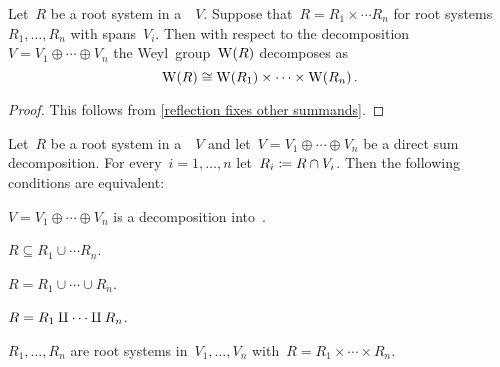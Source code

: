 \begin{lemma}
  \label{decomposition of weyl group}
  Let~$R$ be a root system in a~{\vectorspace{$\kf$}}~$V$.
  Suppose that~$R = R_1 \times \dotsb R_n$ for root systems~$R_1, \dotsc, R_n$ with spans~$V_i$.
  Then with respect to the decomposition~$V = V_1 \oplus \dotsb \oplus V_n$ the Weyl~group~$\operatorname{W}(R)$ decomposes as
  \[
    \operatorname{W}(R)
    \cong
    \operatorname{W}(R_1) \times \dotsb \times \operatorname{W}(R_n) \,.
  \]
\end{lemma}


\begin{proof}
  This follows from \cref{reflection fixes other summands}.
\end{proof}


\begin{lemma}
  \label{characterizations of root system decompositions}
  Let~$R$ be a root system in a~{\vectorspace{$\kf$}}~$V$ and let~$V = V_1 \oplus \dotsb \oplus V_n$ be a direct sum decomposition.
  For every~$i = 1, \dotsc, n$ let~$R_i \coloneqq R \cap V_i$.
  Then the following conditions are equivalent:
  \begin{equivalenceslist}
    \item
      \label{decomposition into subreps}
      $V = V_1 \oplus \dotsb \oplus V_n$ is a decomposition into~{}.
    \item
      \label{contained in union}
      $R \subseteq R_1 \cup \dotsb R_n$.
    \item
      \label{decomposition into subsets}
      $R = R_1 \cup \dotsb \cup R_n$.
    \item
      \label{disjoint decomposition into subsets}
      $R = R_1 \amalg \dotsb \amalg R_n$.
    \item
      \label{decomposition into root systems}
      $R_1, \dotsc, R_n$ are root systems in~$V_1, \dotsc, V_n$ with~$R = R_1 \times \dotsb \times R_n$.
  \end{equivalenceslist}
\end{lemma}


